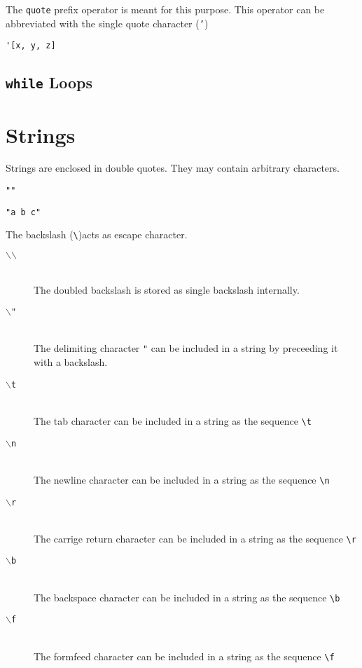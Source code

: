 \documentclass[11pt,a4paper]{scrbook}
\newcommand\BS{\(\backslash\)}
\newcommand\keyword[1]{\texttt{#1}}
\begin{document}
The \keyword{quote} prefix operator is meant for this purpose. This operator
can be abbreviated with the single quote character (\keyword{'})

\begin{lstlisting}[language=BibTool]
'[x, y, z]
\end{lstlisting}


\subsection{\keyword{while} Loops}



\section{Strings}

Strings are enclosed in double quotes. They may contain arbitrary characters.

\begin{lstlisting}[language=BibTool]
""
\end{lstlisting}

\begin{lstlisting}[language=BibTool]
"a b c"
\end{lstlisting}

The backslash (\verb|\|)acts as escape character.
\begin{description}
\item [\tt\BS\BS] \ \\The doubled backslash is stored as single backslash
  internally.
\item [\tt\BS "] \ \\The delimiting character \verb|"| can be included in a
  string by preceeding it with a backslash.
\item [\tt\BS t] \ \\The tab character can be included in a string as the
  sequence \verb|\t|
\item [\tt\BS n] \ \\The newline character can be included in a string as the
  sequence \verb|\n|
\item [\tt\BS r] \ \\The carrige return character can be included in a string as
  the sequence \verb|\r|
\item [\tt\BS b] \ \\The backspace character can be included in a string as the
  sequence \verb|\b|
\item [\tt\BS f] \ \\The formfeed character can be included in a string as the
  sequence \verb|\f|
\end{description}
\end{document}

